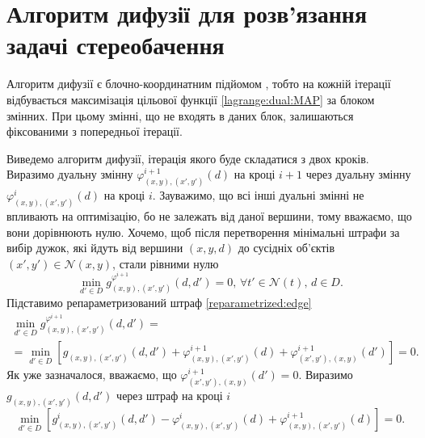 \section{Алгоритм дифузії для розв'язання задачі стереобачення}

Алгоритм дифузії є блочно-координатним підйомом
\cite{overview:savchynskyy:diffusion},
тобто на кожній ітерації відбувається максимізація цільової функції
\eqref{lagrange:dual:MAP} за блоком змінних.
При цьому змінні, що не входять в даних блок,
залишаються фіксованими з попередньої ітерації.

Виведемо алгоритм дифузії, ітерація якого буде складатися з двох кроків.
Виразимо дуальну змінну
$\varphi_{\left(x, y \right), \left(x', y' \right)}^{i + 1} \left( d \right)$
на кроці $i + 1$ через дуальну змінну
$\varphi_{\left(x, y \right), \left(x', y' \right)}^{i} \left( d \right)$
на кроці $i$.
Зауважимо, що всі інші дуальні змінні не впливають на оптимізацію,
бо не залежать від даної вершини, тому вважаємо, що вони дорівнюють нулю.
Хочемо, щоб після перетворення мінімальні штрафи за вибір дужок,
які йдуть від вершини $\left(x, y, d \right)$ до сусідніх об'єктів
$\left(x', y' \right) \in \mathcal{N} \left(x, y \right)$, стали рівними нулю
\begin{equation} \label{requirement:1}
    \min \limits_{d' \in D} g_{\left(x, y \right), \left(x', y' \right)}^{\varphi^{i + 1}}
    \left(
        d, d' \right
    ) = 0, \, \forall t' \in \mathcal{N} \left(t \right), \, d \in D.
\end{equation}
Підставимо репараметризований штраф \eqref{reparametrized:edge}
\begin{equation*}
\begin{gathered}
    \min \limits_{d' \in D}
        g_{\left(x, y \right), \left(x', y' \right)}^{\varphi^{i + 1}}
    \left(
        d, d' \right
    ) = \\
    = \min \limits_{d' \in D} \left[
        g_{\left(x, y \right), \left(x', y' \right)} \left( d, d' \right) +
        \varphi_{\left(x, y \right), \left(x', y' \right)}^{i + 1} \left( d \right) +
        \varphi_{\left(x', y' \right), \left(x, y \right)}^{i + 1} \left( d' \right)
    \right] = 0.
\end{gathered}
\end{equation*}
Як уже зазначалося, вважаємо, що
$\varphi_{\left(x', y' \right), \left(x, y \right)}^{i + 1} \left( d' \right) =
    0$.
Виразимо $g_{\left(x, y \right), \left(x', y' \right)} \left( d, d' \right)$
через штраф на кроці $i$
\begin{equation*}
    \min \limits_{d' \in D} \left[
        g_{\left(x, y \right), \left(x', y' \right)}^{i} \left( d, d' \right) -
        \varphi_{\left(x, y \right), \left(x', y' \right)}^{i} \left( d \right) +
        \varphi_{\left(x, y \right), \left(x', y' \right)}^{i + 1} \left( d \right)
    \right] = 0.
\end{equation*}
